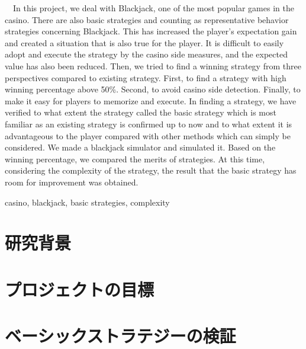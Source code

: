 \documentclass[11pt,a4paper,oneside]{jsbook}
\begin{document}
\begin{eabstract} 
\ \ In this project, we deal with Blackjack, one of the most popular games in the casino. There are
also basic strategies and counting as representative behavior strategies concerning Blackjack. This
has increased the player's expectation gain and created a situation that is also true for the player. It is difficult to easily adopt and execute the strategy by the casino side measures, and the expected value has also been reduced. Then, we tried to find a winning strategy from three perspectives compared to existing strategy. First, to find a strategy with high winning percentage above 50\%. Second, to avoid casino side detection. Finally, to make it easy for players to memorize and execute. In finding a strategy, we have verified to what extent the strategy called the basic strategy which 
is most familiar as an existing strategy is confirmed up to now and to what extent it is advantageous to 
the player compared with other methods which can simply be considered. We made a blackjack simulator and 
simulated it. Based on the winning percentage, we compared the merits of strategies. At this time, considering 
the complexity of the strategy, the result that the basic strategy has room for improvement was obtained.

\begin{ekeyword}
casino, blackjack, basic strategies, complexity
\end{ekeyword}
\end{eabstract}

\tableofcontents
\newpage


\chapter{研究背景}





\chapter{プロジェクトの目標}

\chapter{ベーシックストラテジーの検証}


\end{document}
